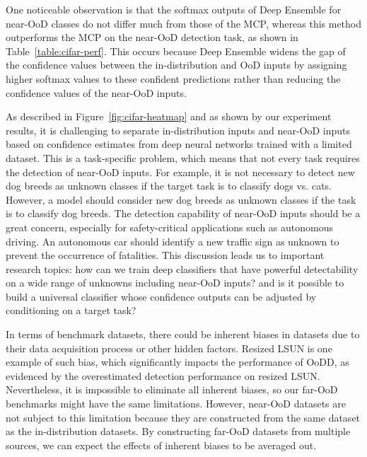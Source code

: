 \documentclass[preprint,12pt]{elsarticle}
\begin{document}
One noticeable observation is that the softmax outputs of Deep Ensemble for near-OoD classes do not differ much from those of the MCP, whereas this method outperforms the MCP on the near-OoD detection task, as shown in Table~\ref{table:cifar-perf}. This occurs because Deep Ensemble widens the gap of the confidence values between the in-distribution and OoD inputs by assigning higher softmax values to these confident predictions rather than reducing the confidence values of the near-OoD inputs. 

As described in Figure~\ref{fig:cifar-heatmap} and as shown by our experiment results, it is challenging to separate in-distribution inputs and near-OoD inputs based on confidence estimates from deep neural networks trained with a limited dataset. This is a task-specific problem, which means that not every task requires the detection of near-OoD inputs. For example, it is not necessary to detect new dog breeds as unknown classes if the target task is to classify dogs vs. cats. However, a model should consider new dog breeds as unknown classes if the task is to classify dog breeds. The detection capability of near-OoD inputs should be a great concern, especially for safety-critical applications such as autonomous driving. An autonomous car should identify a new traffic sign as unknown to prevent the occurrence of fatalities. This discussion leads us to important research topics: how can we train deep classifiers that have powerful detectability on a wide range of unknowns including near-OoD inputs? and is it possible to build a universal classifier whose confidence outputs can be adjusted by conditioning on a target task?

In terms of benchmark datasets, there could be inherent biases in datasets due to their data acquisition process or other hidden factors. Resized LSUN is one example of such bias, which significantly impacts the performance of OoDD, as evidenced by the overestimated detection performance on resized LSUN. Nevertheless, it is impossible to eliminate all inherent biases, so our far-OoD benchmarks might have the same limitations. However, near-OoD datasets are not subject to this limitation because they are constructed from the same dataset as the in-distribution datasets. By constructing far-OoD datasets from multiple sources, we can expect the effects of inherent biases to be averaged out.
\end{document}
